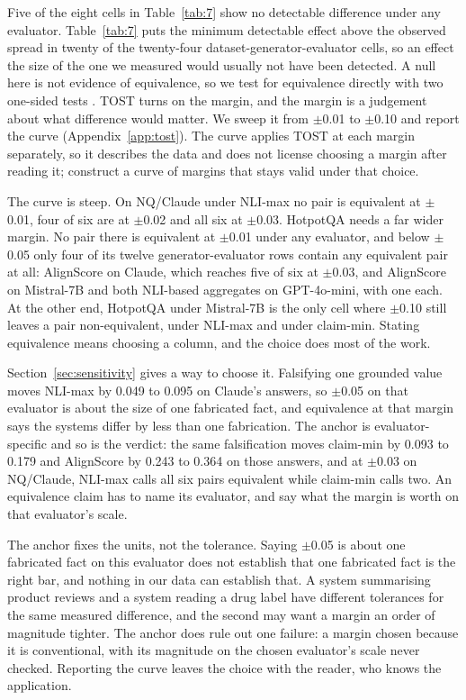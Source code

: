 \documentclass[11pt]{article}
\begin{document}
Five of the eight cells in Table~\ref{tab:7} show no detectable difference under any evaluator. Table~\ref{tab:7} puts the minimum detectable effect above the observed spread in twenty of the twenty-four dataset-generator-evaluator cells, so an effect the size of the one we measured would usually not have been detected. A null here is not evidence of equivalence, so we test for equivalence directly with two one-sided tests \citep{schuirmann-1987}. TOST turns on the margin, and the margin is a judgement about what difference would matter. We sweep it from $\pm$0.01 to $\pm$0.10 and report the curve (Appendix~\ref{app:tost}). The curve applies TOST at each margin separately, so it describes the data and does not license choosing a margin after reading it; \citet{koobs-koning-2026} construct a curve of margins that stays valid under that choice.

The curve is steep. On NQ/Claude under NLI-max no pair is equivalent at $\pm$0.01, four of six are at $\pm$0.02 and all six at $\pm$0.03. HotpotQA needs a far wider margin. No pair there is equivalent at $\pm$0.01 under any evaluator, and below $\pm$0.05 only four of its twelve generator-evaluator rows contain any equivalent pair at all: AlignScore on Claude, which reaches five of six at $\pm$0.03, and AlignScore on Mistral-7B and both NLI-based aggregates on GPT-4o-mini, with one each. At the other end, HotpotQA under Mistral-7B is the only cell where $\pm$0.10 still leaves a pair non-equivalent, under NLI-max and under claim-min. Stating equivalence means choosing a column, and the choice does most of the work.

Section~\ref{sec:sensitivity} gives a way to choose it. Falsifying one grounded value moves NLI-max by 0.049 to 0.095 on Claude's answers, so $\pm$0.05 on that evaluator is about the size of one fabricated fact, and equivalence at that margin says the systems differ by less than one fabrication. The anchor is evaluator-specific and so is the verdict: the same falsification moves claim-min by 0.093 to 0.179 and AlignScore by 0.243 to 0.364 on those answers, and at $\pm$0.03 on NQ/Claude, NLI-max calls all six pairs equivalent while claim-min calls two. An equivalence claim has to name its evaluator, and say what the margin is worth on that evaluator's scale.

The anchor fixes the units, not the tolerance. Saying $\pm$0.05 is about one fabricated fact on this evaluator does not establish that one fabricated fact is the right bar, and nothing in our data can establish that. A system summarising product reviews and a system reading a drug label have different tolerances for the same measured difference, and the second may want a margin an order of magnitude tighter. The anchor does rule out one failure: a margin chosen because it is conventional, with its magnitude on the chosen evaluator's scale never checked. Reporting the curve leaves the choice with the reader, who knows the application.
\end{document}
